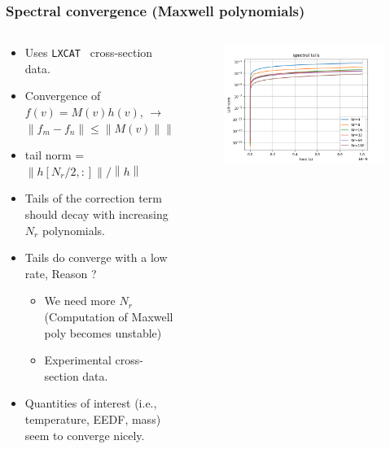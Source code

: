 \documentclass[mathserif, aspectratio=169]{beamer}
\newcommand{\norm}[1]{\left\lVert#1\right\rVert}
\newcommand{\lxcat}{\texttt{LXCAT}}
\begin{document}
	\begin{frame}
		\frametitle{Spectral convergence (Maxwell polynomials)}
		\begin{columns}
			\begin{column}{0.48\textwidth}
				\begin{itemize}
					\item Uses \lxcat~ cross-section data. 
					\item Convergence of $f(v) = M(v) h(v)$,  $\rightarrow$ $\norm{f_{m}- f_{n}} \leq \norm{M(v)} \norm{h_m-h_n}$
					\item tail norm = $\norm{h[N_r/2,:]} / \norm{h}$
					\item Tails of the correction term should decay with increasing $N_r$ polynomials.
					\item Tails do converge with a low rate, Reason ?%
					\begin{itemize}
						\item We need more $N_r$ (Computation of Maxwell poly becomes unstable)
						\item Experimental cross-section data. 
					\end{itemize}
					\item Quantities of interest (i.e., temperature, EEDF, mass) seem to converge nicely. 
				\end{itemize}
			\end{column}
			\begin{column}{0.48\textwidth}
				\begin{figure}
					\centering
					\includegraphics[width=\textwidth]{g0_mw_tails.png}
				\end{figure}
			\end{column}
		\end{columns}
	\end{frame}
\end{document}
